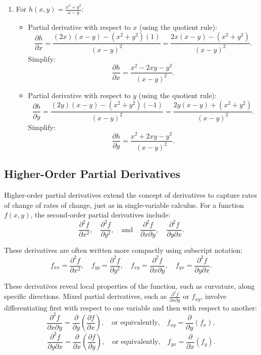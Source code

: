 \begin{example}
\begin{solution}
\begin{enumerate}
    \item For \( h(x, y) = \frac{x^2 + y^2}{x - y} \):
    \begin{itemize}
        \item Partial derivative with respect to \( x \) (using the quotient rule):
        \[
        \frac{\partial h}{\partial x} = \frac{(2x)(x - y) - (x^2 + y^2)(1)}{(x - y)^2} = \frac{2x(x - y) - (x^2 + y^2)}{(x - y)^2}.
        \]
        Simplify:
        \[
        \frac{\partial h}{\partial x} = \frac{x^2 - 2xy - y^2}{(x - y)^2}.
        \]
        \item Partial derivative with respect to \( y \) (using the quotient rule):
        \[
        \frac{\partial h}{\partial y} = \frac{(2y)(x - y) - (x^2 + y^2)(-1)}{(x - y)^2} = \frac{2y(x - y) + (x^2 + y^2)}{(x - y)^2}.
        \]
        Simplify:
        \[
        \frac{\partial h}{\partial y} = \frac{x^2 + 2xy - y^2}{(x - y)^2}.
        \]
    \end{itemize}
\end{enumerate}
\end{solution}
\end{example}
\exampleline

\subsection*{Higher-Order Partial Derivatives} 

\noindent Higher-order partial derivatives extend the concept of derivatives to capture rates of change of rates of change, just as in single-variable calculus. For a function \( f(x, y) \), the second-order partial derivatives include:
\[
\frac{\partial^2 f}{\partial x^2}, \quad \frac{\partial^2 f}{\partial y^2}, \quad \text{and} \quad \frac{\partial^2 f}{\partial x \partial y}, \quad \frac{\partial^2 f}{\partial y \partial x}.
\]

\noindent These derivatives are often written more compactly using subscript notation:
\[
f_{xx} = \frac{\partial^2 f}{\partial x^2}, \quad f_{yy} = \frac{\partial^2 f}{\partial y^2}, \quad f_{xy} = \frac{\partial^2 f}{\partial x \partial y}, \quad f_{yx} = \frac{\partial^2 f}{\partial y \partial x}.
\]

\noindent These derivatives reveal local properties of the function, such as curvature, along specific directions. Mixed partial derivatives, such as \( \frac{\partial^2 f}{\partial x \partial y} \) or \( f_{xy} \), involve differentiating first with respect to one variable and then with respect to another:
\[
\frac{\partial^2 f}{\partial x \partial y} = \frac{\partial}{\partial y} \left( \frac{\partial f}{\partial x} \right), \quad \text{or equivalently,} \quad f_{xy} = \frac{\partial}{\partial y} \left( f_x \right),
\]
\[
\frac{\partial^2 f}{\partial y \partial x} = \frac{\partial}{\partial x} \left( \frac{\partial f}{\partial y} \right), \quad \text{or equivalently,} \quad f_{yx} = \frac{\partial}{\partial x} \left( f_y \right).
\]

